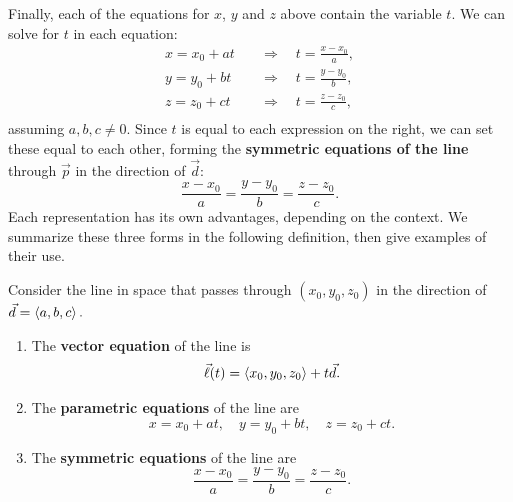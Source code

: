 Finally, each of the equations for $x$, $y$ and $z$ above contain the variable $t$. We can solve for $t$ in each equation:
\begin{align*}
x = x_0+at \quad&\Rightarrow\quad t = \frac{x-x_0}{a},\\
y = y_0+bt \quad&\Rightarrow\quad t = \frac{y-y_0}{b},\\
z = z_0+ct \quad&\Rightarrow\quad t = \frac{z-z_0}{c},\\
\end{align*}
assuming $a,b,c\neq 0$.
Since $t$ is equal to each expression on the right, we can set these equal to each other, forming the \textbf{symmetric equations of the line} through $\vec p$ in the direction of $\vec d$:
\[\frac{x-x_0}{a} = \frac{y-y_0}{b}=\frac{z-z_0}{c}.\]
Each representation has its own advantages, depending on the context. We summarize these three forms in the following definition, then give examples of their use.

\begin{definition}\label{def:lines}%
Consider the line in space that passes through $(x_0,y_0,z_0)$ in the direction of $\vec d =\left\langle a,b,c\right\rangle.$
\begin{enumerate}
	\item The \textbf{vector equation} of the line is
	\[\vec \ell(t) = \left\langle x_0,y_0,z_0\right\rangle+t\vec d.\]
	\item	The \textbf{parametric equations} of the line are
	\[x = x_0+at, \quad y=y_0+bt, \quad z = z_0+ct .\]
	\item	The \textbf{symmetric equations} of the line are
	\[\frac{x-x_0}{a} = \frac{y-y_0}{b}=\frac{z-z_0}{c}.\]
\end{enumerate}
\end{definition}


